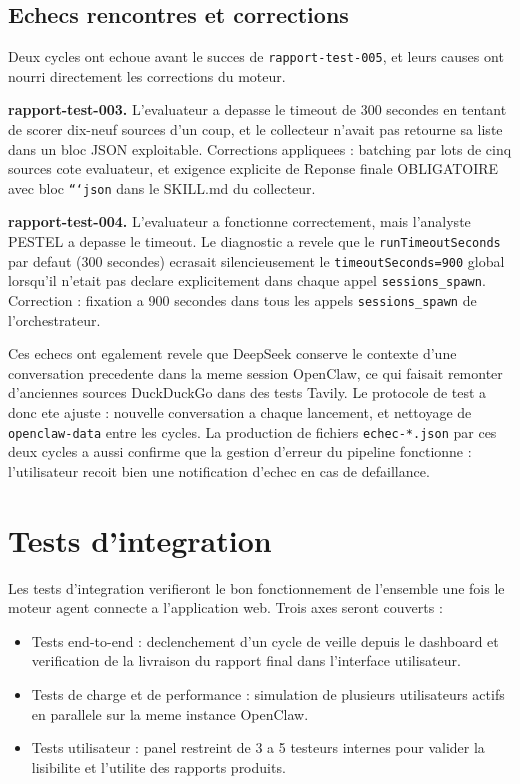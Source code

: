 \documentclass[12pt,a4paper,openany]{report}
\begin{document}
\subsection{Echecs rencontres et corrections}
\label{sec:tests-echecs}

Deux cycles ont echoue avant le succes de \texttt{rapport-test-005}, et leurs causes ont nourri directement les corrections du moteur.

\textbf{rapport-test-003.} L'evaluateur a depasse le timeout de 300 secondes en tentant de scorer dix-neuf sources d'un coup, et le collecteur n'avait pas retourne sa liste dans un bloc JSON exploitable. Corrections appliquees : batching par lots de cinq sources cote evaluateur, et exigence explicite de \og Reponse finale OBLIGATOIRE avec bloc \texttt{```json}\fg{} dans le SKILL.md du collecteur.

\textbf{rapport-test-004.} L'evaluateur a fonctionne correctement, mais l'analyste PESTEL a depasse le timeout. Le diagnostic a revele que le \texttt{runTimeoutSeconds} par defaut (300 secondes) ecrasait silencieusement le \texttt{timeoutSeconds=900} global lorsqu'il n'etait pas declare explicitement dans chaque appel \texttt{sessions\_spawn}. Correction : fixation a 900 secondes dans tous les appels \texttt{sessions\_spawn} de l'orchestrateur.

Ces echecs ont egalement revele que DeepSeek conserve le contexte d'une conversation precedente dans la meme session OpenClaw, ce qui faisait remonter d'anciennes sources DuckDuckGo dans des tests Tavily. Le protocole de test a donc ete ajuste : nouvelle conversation a chaque lancement, et nettoyage de \texttt{openclaw-data} entre les cycles. La production de fichiers \texttt{echec-*.json} par ces deux cycles a aussi confirme que la gestion d'erreur du pipeline fonctionne : l'utilisateur recoit bien une notification d'echec en cas de defaillance.

\section{Tests d'integration}
\label{sec:tests-integration}

\begin{noteBox}[title=Section a completer apres connexion de l'application web]
Les tests d'integration verifieront le bon fonctionnement de l'ensemble une fois le moteur agent connecte a l'application web. Trois axes seront couverts :
\begin{itemize}
  \item Tests end-to-end : declenchement d'un cycle de veille depuis le dashboard et verification de la livraison du rapport final dans l'interface utilisateur.
  \item Tests de charge et de performance : simulation de plusieurs utilisateurs actifs en parallele sur la meme instance OpenClaw.
  \item Tests utilisateur : panel restreint de 3 a 5 testeurs internes pour valider la lisibilite et l'utilite des rapports produits.
\end{itemize}
\end{noteBox}
\end{document}
